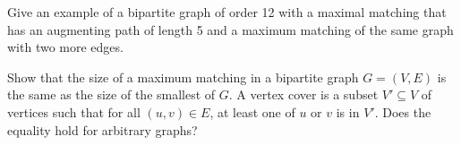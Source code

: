 \begin{Exercise}
Give an example of a bipartite graph of order 12 with a maximal matching 
that has an augmenting path of length 5 and a maximum matching of 
the same graph with two more edges.
\end{Exercise}


\begin{Exercise}\label{ex:konig}
Show that the size of a maximum matching in a bipartite graph $G=(V,E)$ is the
same as the size of the smallest  of $G$.  A vertex cover
is a subset $V' \subseteq V$ of vertices such that for 
all $(u,v) \in E$, at least one of $u$ or $v$ is in $V'$.
Does the equality hold for arbitrary graphs?
\end{Exercise}

%
%


